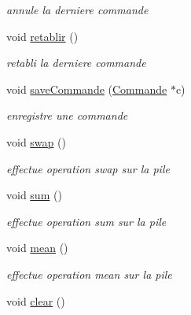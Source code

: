 \begin{DoxyCompactItemize}
\begin{DoxyCompactList}\small\item\em annule la derniere commande \end{DoxyCompactList}\item 
\hypertarget{class_pile_a36b0ff28bf644cebe2d336ebbb0a07ac}{void \hyperlink{class_pile_a36b0ff28bf644cebe2d336ebbb0a07ac}{retablir} ()}\label{class_pile_a36b0ff28bf644cebe2d336ebbb0a07ac}

\begin{DoxyCompactList}\small\item\em retabli la derniere commande \end{DoxyCompactList}\item 
void \hyperlink{class_pile_a03ccb5ba35c7d4264612b8ec922985a8}{save\-Commande} (\hyperlink{class_commande}{Commande} $\ast$c)
\begin{DoxyCompactList}\small\item\em enregistre une commande \end{DoxyCompactList}\item 
\hypertarget{class_pile_a2c9967dc8f5dcb4372475dee52ed64c6}{void \hyperlink{class_pile_a2c9967dc8f5dcb4372475dee52ed64c6}{swap} ()}\label{class_pile_a2c9967dc8f5dcb4372475dee52ed64c6}

\begin{DoxyCompactList}\small\item\em effectue operation swap sur la pile \end{DoxyCompactList}\item 
\hypertarget{class_pile_a955a5f169fe3e25690e08ac1b32c0228}{void \hyperlink{class_pile_a955a5f169fe3e25690e08ac1b32c0228}{sum} ()}\label{class_pile_a955a5f169fe3e25690e08ac1b32c0228}

\begin{DoxyCompactList}\small\item\em effectue operation sum sur la pile \end{DoxyCompactList}\item 
\hypertarget{class_pile_a3539e61bf44a2aa5929c771ef0e45d4b}{void \hyperlink{class_pile_a3539e61bf44a2aa5929c771ef0e45d4b}{mean} ()}\label{class_pile_a3539e61bf44a2aa5929c771ef0e45d4b}

\begin{DoxyCompactList}\small\item\em effectue operation mean sur la pile \end{DoxyCompactList}\item 
\hypertarget{class_pile_aa3991438f190580607d7bbbd50ecc0c3}{void \hyperlink{class_pile_aa3991438f190580607d7bbbd50ecc0c3}{clear} ()}\label{class_pile_aa3991438f190580607d7bbbd50ecc0c3}


\end{DoxyCompactItemize}
